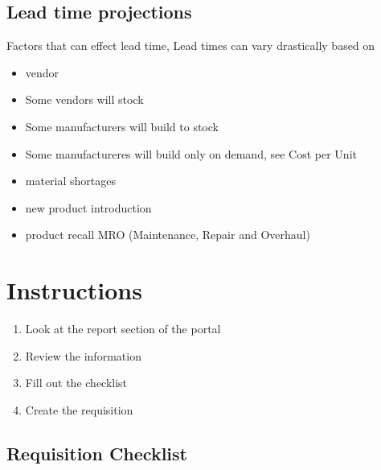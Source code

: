 \documentclass[letterpaper,10pt,english]{sphinxmanual}
\begin{document}
\subsection{Lead time projections}
\label{Questions:lead-time-projections}
Factors that can effect lead time, Lead times can vary drastically based
on
\begin{itemize}
\item {} 
vendor

\item {} 
Some vendors will stock

\item {} 
Some manufacturers will build to stock

\item {} 
Some manufactureres will build only on demand, see Cost per Unit

\item {} 
material shortages

\item {} 
new product introduction

\item {} 
product recall MRO (Maintenance, Repair and Overhaul)

\end{itemize}

\begin{DUlineblock}{0em}
\item[] 
\end{DUlineblock}


\section{Instructions}
\label{Questions:instructions}\begin{enumerate}
\item {} 
Look at the report section of the portal

\item {} 
Review the information

\item {} 
Fill out the checklist

\item {} 
Create the requisition

\end{enumerate}


\subsection{Requisition Checklist}
\label{Questions:requisition-checklist}
\end{document}
